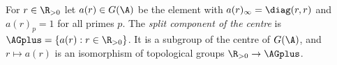 For $r\in\R_{>0}$ let $a(r)\in G(\A)$ be the element with $a(r)_\infty=\diag(r,r)$ and $a(r)_p=1$ for all primes $p$.
The \emph{split component of the centre} is $\AGplus=\{a(r):r\in\R_{>0}\}$. It is a subgroup of the centre of $G(\A)$, and
$r\mapsto a(r)$ is an isomorphism of topological groups $\R_{>0}\to\AGplus$.
